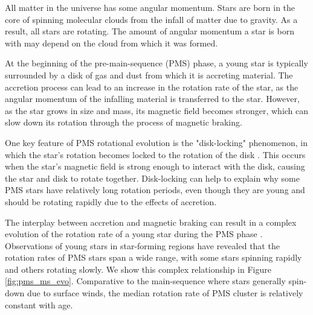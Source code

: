 All matter in the universe has some angular momentum. 
Stars are born in the core of spinning molecular clouds from the infall of matter due to gravity. 
As a result, all stars are rotating.
The amount of angular momentum a star is born with may depend on the cloud from which it was formed.

At the beginning of the  pre-main-sequence (PMS) phase, a young star is typically surrounded by a disk of gas and dust from which it is accreting material.
The accretion process can lead to an increase in the rotation rate of the star, as the angular momentum of the infalling material is transferred to the star.
However, as the star grows in size and mass, its magnetic field becomes stronger, which can slow down its rotation through the process of magnetic braking.

One key feature of PMS rotational evolution is the "disk-locking" phenomenon, in which the star's rotation becomes locked to the rotation of the disk \citep{eggenberger_angular_2012}.
This occurs when the star's magnetic field is strong enough to interact with the disk, causing the star and disk to rotate together.
Disk-locking can help to explain why some PMS stars have relatively long rotation periods, even though they are young and should be rotating rapidly due to the effects of accretion.

The interplay between accretion and magnetic braking can result in a complex evolution of the rotation rate of a young star during the PMS phase \citep{gallet_improved_2013}.
Observations of young stars in star-forming regions have revealed that the rotation rates of PMS stars span a wide range, with some stars spinning rapidly and others rotating slowly.
We show this complex relationship in Figure \ref{fig:pms_ms_evo}.
Comparative to the main-sequence where stars generally spin-down due to surface winds, the median rotation rate of PMS cluster is relatively constant with age.

